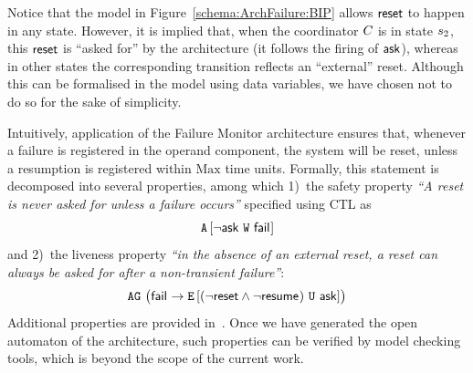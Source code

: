 \documentclass[smallcondensed]{svjour3}
\newcommand{\TODO}[1]{\textcolor{red}{\textbf{[TODO:#1]}}}
\newcommand{\AG}[1][\ ]{\ensuremath{\mathtt{AG}#1}}
\newcommand{\EX}[1][\ ]{\ensuremath{\mathtt{EX}#1}}
\newcommand{\AW}[3][\ ]{\ensuremath{\mathtt{A}\left[#2\ \mathtt{W}\ #3\right]#1}}
\newcommand{\EU}[3][\ ]{\ensuremath{\mathtt{E}\left[#2\ \mathtt{U}\ #3\right]#1}}
\newcommand{\YX}[1]{{\color{red}#1}}
\begin{document}
%

Notice that the model in Figure~\ref{schema:ArchFailure:BIP} allows
$\mathsf{reset}$ to happen in any state.  However, it is implied that,
when the coordinator $C_{}$ is in state $\cstate{2}$, this
$\mathsf{reset}$ is ``asked for'' by the architecture (it follows the
firing of $\mathsf{ask}$), whereas in other states the corresponding
transition reflects an ``external'' reset.  Although this can be
formalised in the model using data variables, we have chosen not to do
so for the sake of simplicity.

Intuitively, application of the Failure Monitor architecture ensures
that, whenever a failure is registered in the operand component, the
system will be reset, unless a resumption is registered within
$\mathrm{Max}$ time units.  Formally, this statement is decomposed
into several properties, among which 
%
1)~the safety property \emph{``A reset is never asked for unless a failure occurs''} specified using CTL as
%
\begin{equation}
  \label{eq:FM:safety}
  \AW[]{\lnot \PortAsk}{\PortFail}
\end{equation}
%
and 2)~the liveness property \emph{``in the absence of an external
  reset, a reset can always be asked for after a non-transient
  failure''}:
%
\begin{equation}
  \label{eq:FM:liveness}
  \AG \bigl(
  \PortFail \rightarrow \EU[]{(\lnot \PortReset \land \lnot \PortResume)}{\PortAsk}
  \bigr)
\end{equation}
%
Additional properties are provided in~\cite{Avocs-RR}. \YX{Once we have generated the open automaton of the architecture, such properties can be verified by model checking tools, which is beyond the scope of the current work.} 


\end{document}
